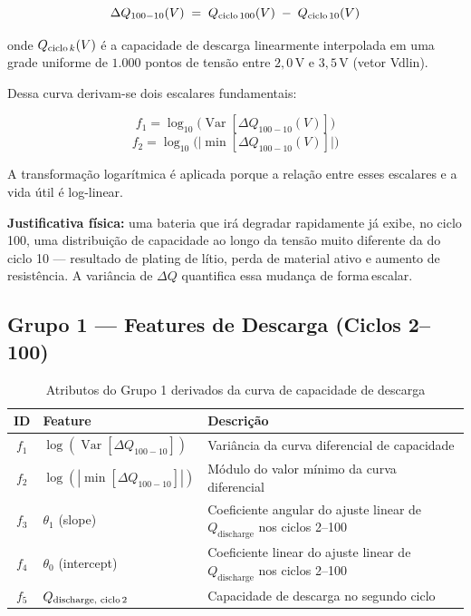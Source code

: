 \documentclass[12pt,a4paper]{article}
\begin{document}
\begin{equation}
  \Delta Q_{100-10}(V) \;=\; Q_{\text{ciclo\,100}}(V) \;-\; Q_{\text{ciclo\,10}}(V)
\end{equation}

onde $Q_{\text{ciclo\,}k}(V)$ \'{e} a capacidade de descarga linearmente
interpolada em uma grade uniforme de $1{.}000$ pontos de tens\~ao entre
$2{,}0$\,V e $3{,}5$\,V (vetor {\ttfamily Vdlin}).

Dessa curva derivam-se dois escalares fundamentais:

\begin{equation}
  f_1 = \log_{10}\!\bigl(\operatorname{Var}[\Delta Q_{100-10}(V)]\bigr)
\end{equation}
\begin{equation}
  f_2 = \log_{10}\!\bigl(\lvert\min[\Delta Q_{100-10}(V)]\rvert\bigr)
\end{equation}

A transforma\c{c}\~ao logar\'{i}tmica \'{e} aplicada porque a rela\c{c}\~ao entre
esses escalares e a vida \'{u}til \'{e} log-linear.

\textbf{Justificativa f\'{i}sica:} uma bateria que ir\'{a} degradar rapidamente j\'{a}
exibe, no ciclo 100, uma distribui\c{c}\~ao de capacidade ao longo da tens\~ao muito
diferente da do ciclo 10 --- resultado de plating de l\'{i}tio, perda de material
ativo e aumento de resist\^{e}ncia. A vari\^{a}ncia de $\Delta Q$ quantifica essa
mudan\c{c}a de forma\,escalar.

\subsection{Grupo 1 --- Features de Descarga (Ciclos 2--100)}

\begin{table}[H]
\centering
\caption{Atributos do Grupo 1 derivados da curva de capacidade de descarga}
\begin{tabular}{@{}clp{6.5cm}@{}}
\toprule
\textbf{ID} & \textbf{Feature} & \textbf{Descri\c{c}\~ao} \\
\midrule
$f_1$ & $\log(\operatorname{Var}[\Delta Q_{100-10}])$ &
  Vari\^{a}ncia da curva diferencial de capacidade \\
$f_2$ & $\log(|\min[\Delta Q_{100-10}]|)$ &
  M\'{o}dulo do valor m\'{i}nimo da curva diferencial \\
$f_3$ & $\theta_1$ (slope) &
  Coeficiente angular do ajuste linear de
  $Q_{\text{discharge}}$ nos ciclos 2--100 \\
$f_4$ & $\theta_0$ (intercept) &
  Coeficiente linear do ajuste linear de
  $Q_{\text{discharge}}$ nos ciclos 2--100 \\
$f_5$ & $Q_{\text{discharge, ciclo\,2}}$ &
  Capacidade de descarga no segundo ciclo \\
\bottomrule
\end{tabular}
\end{table}
\end{document}
